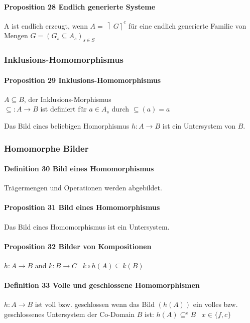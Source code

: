 \paragraph{Proposition 28 Endlich generierte Systeme}
A ist endlich erzeugt, wenn $A = \left \rceil G \right \rceil^c$ für eine endlich generierte Familie von Mengen $G = (G_s \subseteq A_s)_{s \in S}$

\subsubsection{Inklusions-Homomorphismus}

\paragraph{Proposition 29 Inklusions-Homomorphismus}
$A\subseteq B$, der Inklusions-Morphismus \\ $\subseteq:A\rightarrow B$  ist definiert
für $a\in A_{s}$ durch  $\subseteq(a)=a$

Das Bild eines beliebigen Homorphismus $h: A \rightarrow B$ ist ein Untersystem von $B$.

\subsubsection{Homomorphe Bilder}

\paragraph{Definition 30 Bild eines Homomorphismus}
Trägermengen und Operationen werden abgebildet.

\paragraph{Proposition 31 Bild eines Homomorphismus}
Das Bild eines Homomorphismus ist ein Untersystem.

\paragraph{Proposition 32 Bilder von Kompositionen}
$h:A\rightarrow B$ and $k:B\rightarrow C$ \,
$k\circ h(A)\subseteq k(B)$

\paragraph{Definition 33 Volle und geschlossene Homomorphismen}
$h:A\rightarrow B$ ist voll bzw. geschlossen wenn das Bild $(h(A))$ ein volles bzw. geschlossenes Untersystem der Co-Domain $B$ ist: $h(A) \subseteq^x B$ \, $x \in \{f,c\}$


